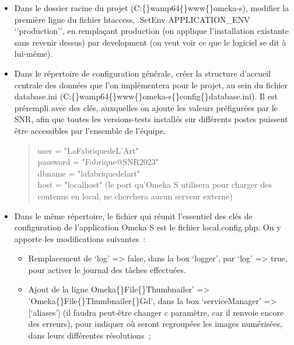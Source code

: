 \documentclass[a4paper,12pt, twoside]{book}
\begin{document}
\begin{itemize}
    \item Dans le dossier racine du projet (\textsf{C:\{\}wamp64\{\}www\{\}omeka-s}), modifier la première ligne du fichier \textsf{htaccess}, .\textsf{\textcolor{graycode}{SetEnv APPLICATION\_ENV ‘’production’’}}, en remplaçant \textsf{\textcolor{graycode}{production}} (on applique l’installation existante sans revenir dessus) par \textsf{\textcolor{graycode}{development}} (on veut voir ce que le logiciel se dit à lui-même).\\

    \item Dans le répertoire de configuration générale, créer la structure d’accueil centrale des données que l’on implémentera pour le projet, au sein du fichier \textsf{database.ini} (\textsf{C:\{\}wamp64\{\}www\{\}omeka-s\{\}config\{\}database.ini}). Il est prérempli avec des clés, auxquelles on ajoute les valeurs préfigurées par le SNR, afin que toutes les versions-tests installés sur différents postes puissent être accessibles par l’ensemble de l’équipe.

    \begin{quote}
    \textsf{\textcolor{graycode}{user = "LaFabriquedeL'Art"\\
    password = "Fabrique@SNR2023"\\
    dbname = "lafabriquedelart"\\
    host = "localhost" (le port qu’Omeka S utilisera pour charger des contenus en local, ne cherchera aucun serveur externe)}}
    \end{quote}

     \item Dans le même répertoire, le fichier qui réunit l’essentiel des clés de configuration de l’application Omeka S est le fichier \textsf{local.config.php}. On y apporte les modifications suivantes~:\\

    \begin{itemize}
        \item Remplacement de \textsf{\textcolor{graycode}{‘log’ => false}}, dans la box \textsf{\textcolor{graycode}{‘logger’}}, par \textsf{\textcolor{graycode}{‘log’ => true}}, pour activer le journal des tâches effectuées.\\

        \item Ajout de la ligne \textsf{\textcolor{graycode}{Omeka\{\}File\{\}Thumbnailer' => 'Omeka\{\}File\{\}Thumbnailer\{\}Gd'}}, dans la box \textsf{\textcolor{graycode}{‘serviceManager’ => [‘aliases’]}} (il faudra peut-être changer c paramètre, car il renvoie encore des erreurs), pour indiquer où seront regroupées les images numérisées, dans leurs différentes résolutions~;\\


\end{itemize}
\end{itemize}
\end{document}
